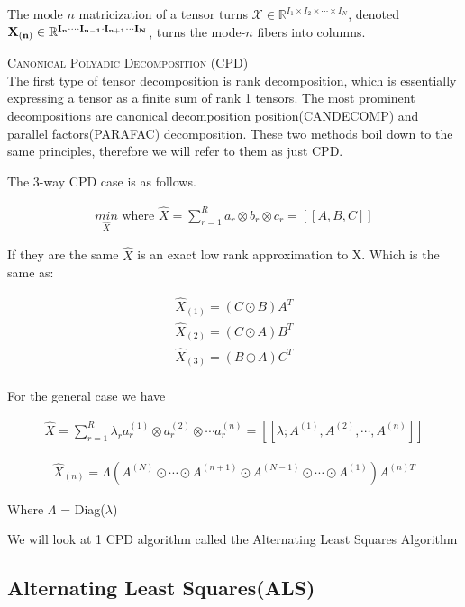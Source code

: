 \documentclass[11pt]{article}
\newcommand\0{\mathbf{0}}
\newcommand\RR{\mathbb{R}}
\newcommand\<{\langle}
\renewcommand\>{\rangle}
\begin{document}
The mode $n$ matricization of a tensor turns $\mathcal{X}\in \RR^{I_1\times I_2 \times \cdots \times I_{N}}$, denoted $\bf{X}_{(n)}\in \RR^{I_{n} \cdot \cdots I_{n-1} \cdot I_{n+1} \cdots I_{N}}$, turns the mode-$n$ fibers into columns.
  

\textsc{Canonical Polyadic Decomposition (CPD)}\\

The first type of tensor decomposition is rank decomposition, which is essentially expressing 
a tensor as a finite sum of rank 1 tensors. The most prominent decompositions are canonical decomposition position(CANDECOMP) and parallel factors(PARAFAC) decomposition. These two methods boil down to the same principles, therefore we will refer to them as just CPD.

The 3-way CPD case is as follows.

\begin{align*}
\underset{\hat{X}}{min} \text{ where } \hat{X} = \sum_{r=1}^{R}a_{r} \otimes b_{r} \otimes c_{r} = [[A,B,C]]
\end{align*}

If they are the same $\hat X$ is an exact low rank approximation to X. Which is the same as:

\begin{align*}
    \hat X_{(1)}=(C \odot B)A^{T}\\
    \hat X_{(2)}=(C \odot A)B^{T}\\
    \hat X_{(3)}=(B \odot A)C^{T}\\
\end{align*}

For the general case we have

\begin{align*}
\hat X = \sum_{r=1}^{R} \lambda_r a_r^{(1)}\otimes a_r^{(2)} \otimes \cdots a_r^{(n)}
= [[\lambda; A^{(1)}, A^{(2)},\cdots , A^{(n)}]]
\end{align*}

\begin{align*}
\hat X_{(n)} = \Lambda(A^{(N)} \odot \cdots \odot A^{(n+1)} \odot A^{(N-1)} \odot \cdots \odot A^{(1)} )A^{(n)T}
\end{align*}

Where $\Lambda$ = Diag($\lambda$)

We will look at 1 CPD algorithm called the Alternating Least Squares Algorithm

\subsection{Alternating Least Squares(ALS)}
\end{document}
